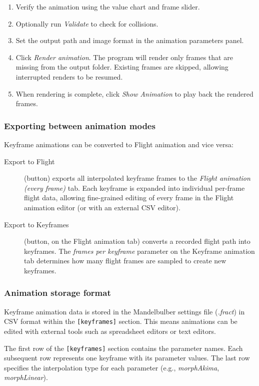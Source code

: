 \begin{enumerate}
	\item Verify the animation using the value chart and frame slider.
	
	\item Optionally run \emph{Validate} to check for collisions.
	
	\item Set the output path and image format in the animation parameters panel.
	
	\item Click \emph{Render animation}. The program will render only frames that are missing from the output folder. Existing frames are skipped, allowing interrupted renders to be resumed.
	
	\item When rendering is complete, click \emph{Show Animation} to play back the rendered frames.
\end{enumerate}

\subsubsection{Exporting between animation modes}

Keyframe animations can be converted to Flight animation and vice versa:

\begin{description}
	\item[Export to Flight] (button) exports all interpolated keyframe frames to the \emph{Flight animation (every frame)} tab. Each keyframe is expanded into individual per-frame flight data, allowing fine-grained editing of every frame in the Flight animation editor (or with an external CSV editor).
	
	\item[Export to Keyframes] (button, on the Flight animation tab) converts a recorded flight path into keyframes. The \emph{frames per keyframe} parameter on the Keyframe animation tab determines how many flight frames are sampled to create new keyframes.
\end{description}

\subsubsection{Animation storage format}

Keyframe animation data is stored in the Mandelbulber settings file (\emph{.fract}) in CSV format within the \texttt{[keyframes]} section. This means animations can be edited with external tools such as spreadsheet editors or text editors.

The first row of the \texttt{[keyframes]} section contains the parameter names. Each subsequent row represents one keyframe with its parameter values. The last row specifies the interpolation type for each parameter (e.g., \emph{morphAkima}, \emph{morphLinear}).
